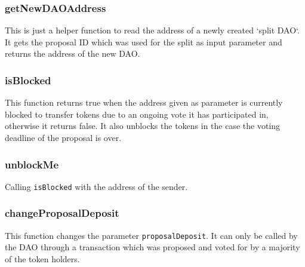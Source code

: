 \documentclass[9pt,oneside]{amsart}
\begin{document}
\begin{multicols}{2}
\subsubsection*{getNewDAOAddress}
This is just a helper function to read the address of a newly created `split DAO`. It gets the proposal ID which was used for the split as input parameter and returns the address of the new DAO.

\subsubsection*{isBlocked}
This function returns true when the address given as parameter is currently blocked to transfer tokens due to an ongoing vote it has participated in, otherwise it returns false. It also unblocks the tokens in the case the voting deadline of the proposal is over.

\subsubsection*{unblockMe}
Calling \verb|isBlocked| with the address of the sender.

\subsubsection*{changeProposalDeposit}
This function changes the parameter \verb|proposalDeposit|. It can only be called by the DAO through a transaction which was proposed and voted for by a majority of the token holders.


\end{multicols}
\end{document}
